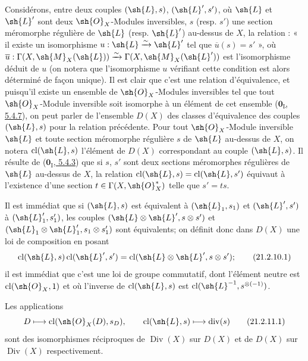 \begin{env}[21.2.10]
\label{IV.21.2.10}
Considérons, entre deux couples $(\sh{L},s)$, $(\sh{L}',s')$, où $\sh{L}$ et $\sh{L}'$ sont deux $\sh{O}_X$-Modules inversibles, $s$ (resp. $s'$) une section méromorphe régulière de $\sh{L}$ (resp. $\sh{L}'$) au-dessus de $X$, la relation : « il existe un isomorphisme $u:\sh{L}\xrightarrow{\sim}\sh{L}'$ tel que $\overline{u}(s)=s'$ », où $\overline{u}:\Gamma(X,\sh{M}_X(\sh{L}))\xrightarrow{\sim}\Gamma(X,\sh{M}_X(\sh{L}'))$ est l'isomorphisme déduit de $u$ (on notera que l'isomorphisme $u$ vérifiant cette condition est alors déterminé de façon unique).
Il est clair que c'est une relation d'équivalence, et puisqu'il existe un ensemble de $\sh{O}_X$-Modules inversibles tel que tout $\sh{O}_X$-Module inversible soit isomorphe à un élément de cet ensemble (\hyperref[0.5.4.7]{$\mathbf{0}_{\mathrm I}$, 5.4.7}), on peut parler de l'ensemble $D(X)$ des classes d'équivalence des couples $(\sh{L},s)$ pour la relation précédente.
Pour tout $\sh{O}_X$-Module inversible $\sh{L}$ et toute section
méromorphe régulière $s$ de $\sh{L}$ au-dessus de $X$, on notera $\operatorname{cl}(\sh{L},s)$ l'élément de $D(X)$ correspondant au couple $(\sh{L},s)$.
Il résulte de (\hyperref[0.5.4.3]{$\mathbf{0}_{\mathrm I}$, 5.4.3}) que si $s$, $s'$ sont deux sections méromorphes régulières de $\sh{L}$ au-dessus de $X$, la relation $\operatorname{cl}(\sh{L},s)=\operatorname{cl}(\sh{L},s')$ équivaut à l'existence d'une section $t\in\Gamma(X,\sh{O}_X^*)$ telle que $s'=ts$.

Il est immédiat que si $(\sh{L},s)$ est équivalent à $(\sh{L}_1,s_1)$ et $(\sh{L}',s')$ à $(\sh{L}_1',s_1')$, les couples $(\sh{L}\otimes\sh{L}',s\otimes s')$ et $(\sh{L}_1\otimes\sh{L}_1',s_1\otimes s_1')$ sont équivalents;
on définit donc dans $D(X)$ une loi de composition en posant
\[
\label{IV.21.2.10.1}
  \operatorname{cl}(\sh{L},s)\operatorname{cl}(\sh{L}',s')=\operatorname{cl}(\sh{L}\otimes\sh{L}',s\otimes s');
  \tag{21.2.10.1}
\]
il est immédiat que c'est une loi de groupe commutatif, dont l'élément neutre est $\operatorname{cl}(\sh{O}_X,1)$ et où l'inverse de $\operatorname{cl}(\sh{L},s)$ est $\operatorname{cl}(\sh{L}^{-1},s^{\otimes(-1)})$.
\end{env}

\begin{proposition}[21.2.11]
\label{IV.21.2.11}
Les applications
\[
\label{IV.21.2.11.1}
  D\mapsto\operatorname{cl}(\sh{O}_X(D),s_D),\qquad \operatorname{cl}(\sh{L},s)\mapsto\operatorname{div}(s)
  \tag{21.2.11.1}
\]
sont des isomorphismes réciproques de $\operatorname{Div}(X)$ sur $D(X)$ et de $D(X)$ sur $\operatorname{Div}(X)$ respectivement.
\end{proposition}

